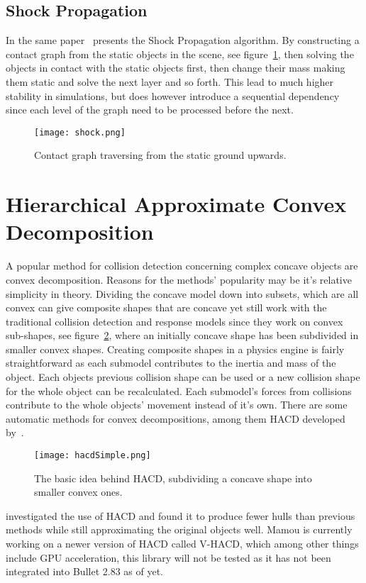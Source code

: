 \subsection{Shock Propagation}
In the same paper~\cite{guendelman} presents the Shock Propagation algorithm.
By constructing a contact graph from the static objects in the scene, see figure~\ref{fig:cont},
then solving the objects in contact with the static objects first, then change their
mass making them static and solve the next layer and so forth. This lead to much
higher stability in simulations, but does however introduce a sequential dependency
since each level of the graph need to be processed before the next.

\begin{figure}[H]
  \centering
  \texttt{[image: shock.png]}
  \caption{Contact graph traversing from the static ground upwards.}
  \label{fig:cont}
\end{figure}

\section{Hierarchical Approximate Convex Decomposition}
A popular method for collision detection concerning complex concave objects
are convex decomposition. Reasons for the methods' popularity may be it's relative
simplicity in theory. Dividing the concave model down into subsets, which are
all convex can give composite shapes that are concave yet still work with the
traditional collision detection and response models since they work on convex
sub-shapes, see figure~\ref{fig:hacdSimple}, where an initially concave shape has
been subdivided in smaller convex shapes. Creating composite shapes in a physics
engine is fairly straightforward as each submodel contributes to the inertia and
mass of the object. Each objects previous collision shape can be used or a new collision
shape for the whole object can be recalculated. Each submodel's forces from collisions
contribute to the whole objects' movement instead of it's own.
There are some automatic methods for convex decompositions, among them HACD developed by~\cite{mamou}.

\begin{figure}[H]
  \centering
  \texttt{[image: hacdSimple.png]}
  \caption{The basic idea behind HACD, subdividing a concave shape into smaller convex ones.}
  \label{fig:hacdSimple}
\end{figure}

\cite{HACD} investigated the use of HACD and found it to produce fewer hulls
than previous methods while still approximating the original objects well.
Mamou is currently working on a newer version of HACD called
V-HACD, which among other things include GPU acceleration, this library will not be
tested as it has not been integrated into Bullet 2.83 as of yet.
